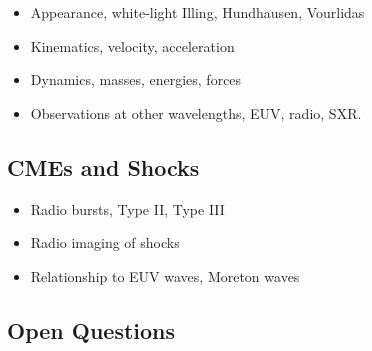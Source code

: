 \begin{itemize}
\item Appearance, white-light Illing, Hundhausen, Vourlidas
\item Kinematics, velocity, acceleration
\item Dynamics, masses, energies, forces
\item Observations at other wavelengths, EUV, radio, SXR.
\end{itemize}

\subsection{CMEs and Shocks}\label{sec:21}

\begin{itemize}
\item Radio bursts, Type II, Type III
\item Radio imaging of shocks
\item Relationship to EUV waves, Moreton waves
\end{itemize}

\subsection{Open Questions}\label{sec:22}






